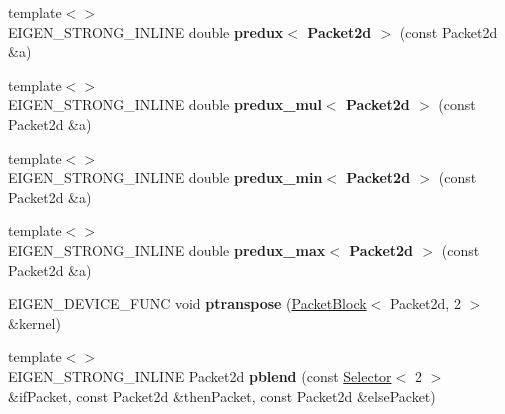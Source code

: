 \begin{DoxyCompactItemize}
\item 
\mbox{\label{namespace_eigen_1_1internal_a09278c9f5a526f5e39c882f95238a65a}} 
{\footnotesize template$<$$>$ }\\E\+I\+G\+E\+N\+\_\+\+S\+T\+R\+O\+N\+G\+\_\+\+I\+N\+L\+I\+NE double {\bfseries predux$<$ Packet2d $>$} (const Packet2d \&a)
\item 
\mbox{\label{namespace_eigen_1_1internal_a8cc535b17cd693b49e3a29d50c8a1afb}} 
{\footnotesize template$<$$>$ }\\E\+I\+G\+E\+N\+\_\+\+S\+T\+R\+O\+N\+G\+\_\+\+I\+N\+L\+I\+NE double {\bfseries predux\+\_\+mul$<$ Packet2d $>$} (const Packet2d \&a)
\item 
\mbox{\label{namespace_eigen_1_1internal_a91a2407669903bcb8a10ea93751a4411}} 
{\footnotesize template$<$$>$ }\\E\+I\+G\+E\+N\+\_\+\+S\+T\+R\+O\+N\+G\+\_\+\+I\+N\+L\+I\+NE double {\bfseries predux\+\_\+min$<$ Packet2d $>$} (const Packet2d \&a)
\item 
\mbox{\label{namespace_eigen_1_1internal_a57f0f7472873a0e72fb6648aff40bd1e}} 
{\footnotesize template$<$$>$ }\\E\+I\+G\+E\+N\+\_\+\+S\+T\+R\+O\+N\+G\+\_\+\+I\+N\+L\+I\+NE double {\bfseries predux\+\_\+max$<$ Packet2d $>$} (const Packet2d \&a)
\item 
\mbox{\label{namespace_eigen_1_1internal_af5d3a9a365815a41a96998616ac72242}} 
E\+I\+G\+E\+N\+\_\+\+D\+E\+V\+I\+C\+E\+\_\+\+F\+U\+NC void {\bfseries ptranspose} (\hyperlink{struct_eigen_1_1internal_1_1_packet_block}{Packet\+Block}$<$ Packet2d, 2 $>$ \&kernel)
\item 
\mbox{\label{namespace_eigen_1_1internal_a7370a006d1d0d00be298b21a0b74b8ae}} 
{\footnotesize template$<$$>$ }\\E\+I\+G\+E\+N\+\_\+\+S\+T\+R\+O\+N\+G\+\_\+\+I\+N\+L\+I\+NE Packet2d {\bfseries pblend} (const \hyperlink{struct_eigen_1_1internal_1_1_selector}{Selector}$<$ 2 $>$ \&if\+Packet, const Packet2d \&then\+Packet, const Packet2d \&else\+Packet)
\item 
\mbox{\label{namespace_eigen_1_1internal_a54bcd5d6003b5b636704436a2bdf388a}} 

\end{DoxyCompactItemize}
